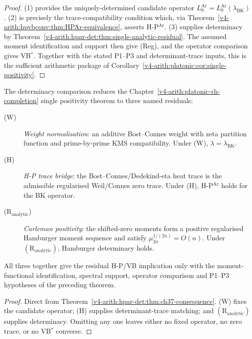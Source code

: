 \begin{proof}
(1) provides the uniquely-determined candidate operator
\(L_{0}^{\mathrm{Ar}}=L_{0}^{\mathrm{Ar}}(\lambda_{\mathrm{BK}})\).
(2) is precisely the trace-compatibility condition which, via
Theorem~\ref{v4-arith:hpvbconv:thm:HPAr-equivalence}, asserts
H-P\(^{\mathrm{Ar}}\). (3) supplies determinacy by
Theorem~\ref{v4-arith:hpar-det:thm:single-analytic-residual}.
The assumed moment identification and support then give (Reg),
and the operator comparison gives VB\(^{*}\). Together with the
stated P1--P3 and determinant-trace inputs, this is the sufficient
arithmetic package of
Corollary~\ref{v4-arith:platonic:cor:single-positivity}.
\end{proof}

\begin{corollary}
\label{v4-arith:hpar-det:cor:wave3-structure}
The determinacy comparison reduces the Chapter~\ref{v4-arith:platonic-rh-completion} single positivity
theorem to three named residuals:
\begin{description}
\item[(\(\mathrm{W}\))] \emph{Weight normalisation}: an additive
Bost--Connes weight with zeta partition function and prime-by-prime
KMS compatibility. Under (W), \(\lambda=\lambda_{\mathrm{BK}}\).
\item[(\(\mathrm{H}\))] \emph{H-P trace bridge}: the
Bost--Connes/Dedekind-eta heat trace is the admissible regularised
Weil/Connes zero trace. Under (H), H-P\(^{\mathrm{Ar}}\) holds for the
BK operator.
\item[(\(\mathrm{R}_{\mathrm{analytic}}\))] \emph{Carleman positivity}:
the shifted-zero moments form a positive regularised Hamburger moment
sequence and satisfy \(\mu_{2n}^{1/(2n)}=O(n)\). Under
\((\mathrm{R}_{\mathrm{analytic}})\), Hamburger determinacy holds.
\end{description}
All three together give the residual H-P/VB implication only with
the moment-functional identification, spectral support, operator
comparison and P1--P3 hypotheses of the preceding theorem.
\end{corollary}

\begin{proof}
Direct from Theorem~\ref{v4-arith:hpar-det:thm:ch37-consequence}. (W) fixes
the candidate operator; (H) supplies determinant-trace matching; and
\((\mathrm{R}_{\mathrm{analytic}})\) supplies determinacy. Omitting any
one leaves either no fixed operator, no zero trace, or no VB\(^{*}\)
converse.
\end{proof}

